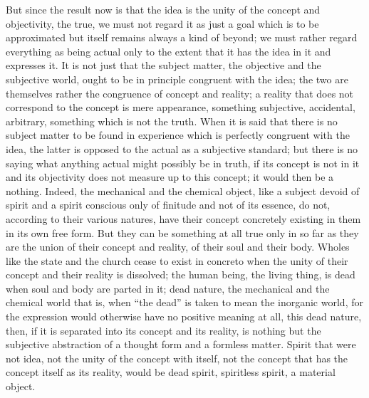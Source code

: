 But since the result now is that the idea is
the unity of the concept and objectivity, the true,
we must not regard it as just a goal
which is to be approximated
but itself remains always a kind of beyond;
we must rather regard everything as being actual
only to the extent that it has the idea
in it and expresses it.
It is not just that the subject matter,
the objective and the subjective world,
ought to be in principle congruent with the idea;
the two are themselves rather the
congruence of concept and reality;
a reality that does not correspond
to the concept is mere appearance,
something subjective, accidental, arbitrary,
something which is not the truth.
When it is said that there is no subject matter
to be found in experience
which is perfectly congruent with the idea,
the latter is opposed to the actual
as a subjective standard;
but there is no saying what
anything actual might possibly be in truth,
if its concept is not in it
and its objectivity does not
measure up to this concept;
it would then be a nothing.
Indeed, the mechanical and the chemical object,
like a subject devoid of spirit
and a spirit conscious only of finitude
and not of its essence,
do not, according to their various natures,
have their concept concretely existing in them
in its own free form.
But they can be something at all true
only in so far as they are the union
of their concept and reality,
of their soul and their body.
Wholes like the state and the church
cease to exist in concreto when the unity
of their concept and their reality is dissolved;
the human being, the living thing, is dead
when soul and body are parted in it;
dead nature, the mechanical and the chemical
world that is, when “the dead” is taken
to mean the inorganic world,
for the expression would otherwise have
no positive meaning at all,
this dead nature, then, if it is separated
into its concept and its reality,
is nothing but the subjective abstraction of
a thought form and a formless matter.
Spirit that were not idea,
not the unity of the concept with itself,
not the concept that has the concept itself as its reality,
would be dead spirit, spiritless spirit, a material object.

